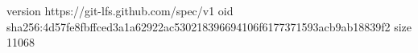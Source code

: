 version https://git-lfs.github.com/spec/v1
oid sha256:4d57fe8fbffced3a1a62922ac530218396694106f6177371593acb9ab18839f2
size 11068
